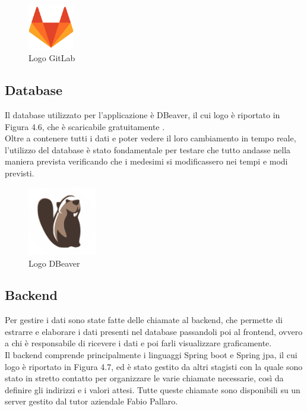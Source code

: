 \begin{figure}[htbp]	
	\centering
	\includegraphics[width=2cm]{immagini/logogitlab.png}
	\caption{Logo GitLab}
	\label{fig:Logo GitLab}\end{figure}

\newpage

\subsection{Database}
Il database utilizzato per l'applicazione è DBeaver, il cui logo è riportato in Figura 4.6, che è scaricabile gratuitamente \cite{downdb}.\\
Oltre a contenere tutti i dati e poter vedere il loro cambiamento in tempo reale, l'utilizzo del database è stato fondamentale per testare che tutto andasse nella maniera prevista verificando che i medesimi si modificassero nei tempi e modi previsti.\\

\begin{figure}[htbp]	
	\centering
	\includegraphics[width=3cm]{immagini/logodbeaver.png}
	\caption{Logo DBeaver}
	\label{fig:Logo DBeaver}
\end{figure}

\subsection{Backend}
Per gestire i dati sono state fatte delle chiamate al backend, che permette di estrarre e elaborare i dati presenti nel database passandoli poi al frontend, ovvero a chi è responsabile di ricevere i dati e poi farli visualizzare graficamente.\\
Il backend comprende principalmente i linguaggi Spring boot e Spring jpa, il cui logo è riportato in Figura 4.7, ed è stato gestito da altri stagisti con la quale sono stato in stretto contatto per organizzare le varie chiamate necessarie, così da definire gli indirizzi e i valori attesi.
Tutte queste chiamate sono disponibili su un server gestito dal tutor aziendale Fabio Pallaro.\\

